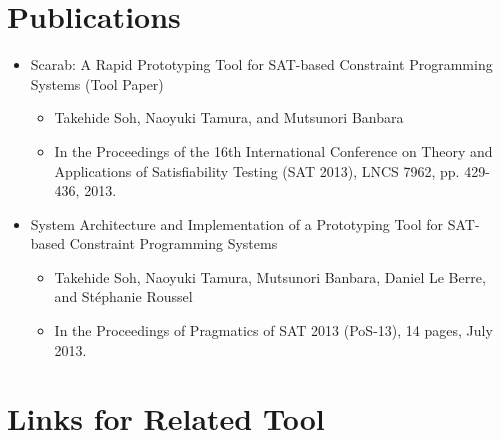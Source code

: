 \documentclass[11pt]{article}
\begin{document}
\section*{Publications}
\label{sec-3}
\begin{itemize}
\item Scarab: A Rapid Prototyping Tool for SAT-based Constraint Programming Systems (Tool Paper)
\begin{itemize}
\item Takehide Soh, Naoyuki Tamura, and Mutsunori Banbara
\item In the Proceedings of the 16th International Conference on Theory and Applications of Satisfiability Testing (SAT 2013), LNCS 7962, pp. 429-436, 2013.
\end{itemize}
\item System Architecture and Implementation of a Prototyping Tool for SAT-based Constraint Programming Systems
\begin{itemize}
\item Takehide Soh, Naoyuki Tamura, Mutsunori Banbara, Daniel Le Berre, and Stéphanie Roussel
\item In the Proceedings of Pragmatics of SAT 2013 (PoS-13), 14 pages, July 2013.
\end{itemize}
\end{itemize}


\section*{Links for Related Tool}
\label{sec-4}
\end{document}

